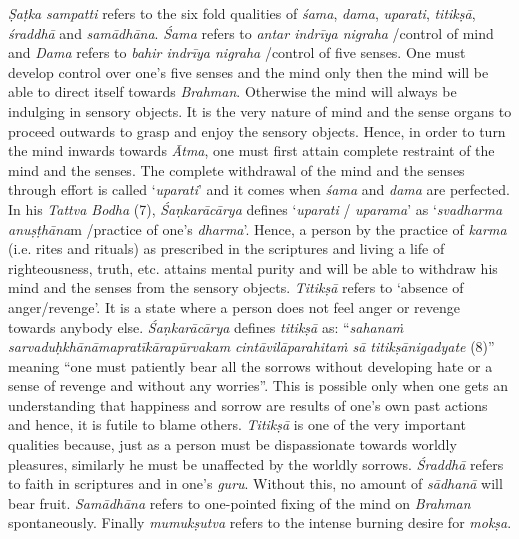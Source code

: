 \emph{Ṣaṭka} \emph{sampatti} refers to the six fold qualities of \emph{śama}, \emph{dama}, \emph{uparati}, \emph{titikṣā}, \emph{śraddhā} and \emph{samādhāna}. \emph{Śama} refers to \emph{antar indrīya nigraha} /control of mind and \emph{Dama} refers to \emph{bahir indrīya nigraha} /control of five senses. One must develop control over one's five senses and the mind only then the mind will be able to direct itself towards \emph{Brahman}. Otherwise the mind will always be indulging in sensory objects. It is the very nature of mind and the sense organs to proceed outwards to grasp and enjoy the sensory objects. Hence, in order to turn the mind inwards towards \emph{Ātma}, one must first attain complete restraint of the mind and the senses. The complete withdrawal of the mind and the senses through effort is called `\emph{uparati}' and it comes when \emph{śama} and \emph{dama} are perfected. In his \emph{Tattva Bodha} (7), \emph{Śaṇkarācārya} defines `\emph{uparati} / \emph{uparama}' as `\emph{svadharma} \emph{anuṣṭhāna}m /practice of one's \emph{dharma}'. Hence, a person by the practice of \emph{karma} (i.e. rites and rituals) as prescribed in the scriptures and living a life of righteousness, truth, etc. attains mental purity and will be able to withdraw his mind and the senses from the sensory objects. \emph{Titikṣā} refers to `absence of anger/revenge'. It is a state where a person does not feel anger or revenge towards anybody else. \emph{Śaṇkarācārya} defines \emph{titikṣā} as: ``\emph{sahanaṁ sarvaduḥkhānāmapratīkārapūrvakam } \emph{cintāvilāparahitaṁ sā titikṣānigadyate } (8)'' meaning ``one must patiently bear all the sorrows without developing hate or a sense of revenge and without any worries''. This is possible only when one gets an understanding that happiness and sorrow are results of one's own past actions and hence, it is futile to blame others. \emph{Titikṣā} is one of the very important qualities because, just as a person must be dispassionate towards worldly pleasures, similarly he must be unaffected by the worldly sorrows. \emph{Śraddhā} refers to faith in scriptures and in one's \emph{guru}. Without this, no amount of \emph{sādhanā} will bear fruit. \emph{Samādhāna} refers to one-pointed fixing of the mind on \emph{Brahman} spontaneously. Finally \emph{mumukṣutva} refers to the intense burning desire for \emph{mokṣa}.


